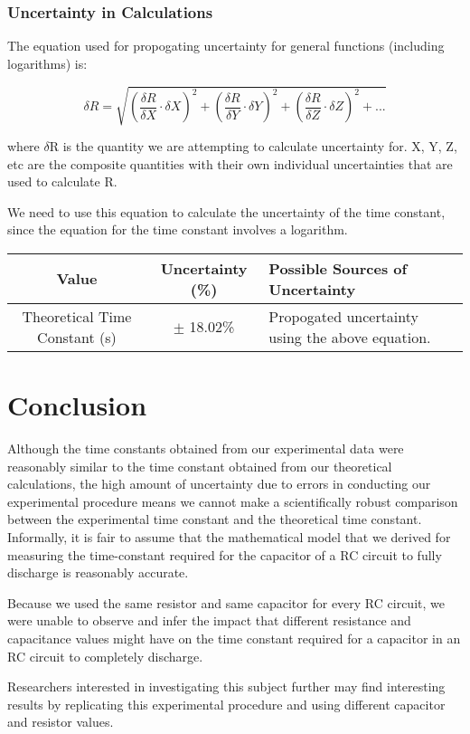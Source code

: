 \documentclass[12pt]{article}
\begin{document}
\pagebreak

\subsubsection*{Uncertainty in Calculations}

The equation used for propogating uncertainty for general functions (including logarithms) is:

$$ \delta R = \sqrt{\left(\frac{\delta R}{\delta X}  \cdot{\delta}X\right)^{2} + \left(\frac{\delta R}{\delta Y}  \cdot{\delta}Y\right)^{2} + \left(\frac{\delta R}{\delta Z}  \cdot{\delta}Z\right)^{2} + ... }$$

where $\delta$R is the quantity we are attempting to calculate uncertainty for. X, Y, Z, etc are the composite quantities with their own individual uncertainties that are used to calculate R.


We need to use this equation to calculate the uncertainty of the time constant, since the equation for the time constant involves a logarithm.

\begin{table}[h!]
\centering
\begin{tabular}{||c |c |p{6cm}||} 
 \hline
Value & Uncertainty (\%) & Possible Sources of Uncertainty  \\ [0.5ex] 
 \hline
 Theoretical Time Constant (s) & $\pm$ 18.02\% & Propogated uncertainty using the above equation.\\

 \hline
\end{tabular}
\end{table}



\pagebreak

\section*{\centering Conclusion}

Although the time constants obtained from our experimental data were reasonably similar to the time constant obtained from our theoretical calculations, the high amount of uncertainty due to errors in conducting our experimental procedure means we cannot make a scientifically robust comparison between the experimental time constant and the theoretical time constant. Informally, it is fair to assume that the mathematical model that we derived for measuring the time-constant required for the capacitor of a RC circuit to fully discharge is reasonably accurate.

Because we used the same resistor and same capacitor for every RC circuit, we were unable to observe and infer the impact that different resistance and capacitance values might have on the time constant required for a capacitor in an RC circuit to completely discharge.

Researchers interested in investigating this subject further may find interesting results by replicating this experimental procedure and using different capacitor and resistor values. 
\pagebreak
\end{document}
